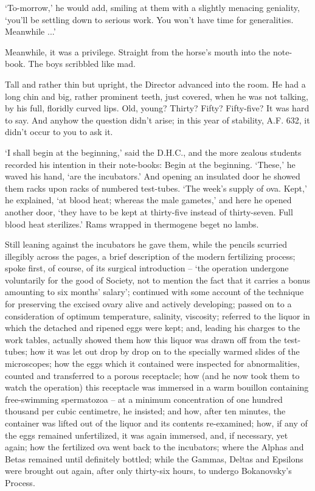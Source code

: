 \documentclass[10pt,a4paper]{article}
\newcommand{\sqm}[1]{‘#1’}
\begin{document}
\sqm{To-morrow,} he would add, smiling at them with a slightly menacing geniality, \sqm{you'll be settling down to serious work. You won't have time for generalities. Meanwhile ...}

Meanwhile, it was a privilege. Straight from the horse's mouth into the note-book. The boys scribbled like mad.

Tall and rather thin but upright, the Director advanced into the room. He had a long chin and big, rather prominent teeth, just covered, when he was not talking, by his full, floridly curved lips. Old, young? Thirty? Fifty? Fifty-five? It was hard to say. And anyhow the question didn't arise; in this year of stability, A.F. 632, it didn't occur to you to ask it.

\sqm{I shall begin at the beginning,} said the D.H.C., and the more zealous students recorded his intention in their note-books: Begin at the beginning. \sqm{These,} he waved his hand, \sqm{are the incubators.} And opening an insulated door he showed them racks upon racks of numbered test-tubes. \sqm{The week's supply of ova. Kept,} he explained, \sqm{at blood heat; whereas the male gametes,} and here he opened another door, \sqm{they have to be kept at thirty-five instead of thirty-seven. Full blood heat sterilizes.} Rams wrapped in thermogene beget no lambs.

Still leaning against the incubators he gave them, while the pencils scurried illegibly across the pages, a brief description of the modern fertilizing process; spoke first, of course, of its surgical introduction – \sqm{the operation undergone voluntarily for the good of Society, not to mention the fact that it carries a bonus amounting to six months' salary}; continued with some account of the technique for preserving the excised ovary alive and actively developing; passed on to a consideration of optimum temperature, salinity, viscosity; referred to the liquor in which the detached and ripened eggs were kept; and, leading his charges to the work tables, actually showed them how this liquor was drawn off from the test-tubes; how it was let out drop by drop on to the specially warmed slides of the microscopes; how the eggs which it contained were inspected for abnormalities, counted and transferred to a porous receptacle; how (and he now took them to watch the operation) this receptacle was immersed in a warm bouillon containing free-swimming spermatozoa – at a minimum concentration of one hundred thousand per cubic centimetre, he insisted; and how, after ten minutes, the container was lifted out of the liquor and its contents re-examined; how, if any of the eggs remained unfertilized, it was again immersed, and, if necessary, yet again; how the fertilized ova went back to the incubators; where the Alphas and Betas remained until definitely bottled; while the Gammas, Deltas and Epsilons were brought out again, after only thirty-six hours, to undergo Bokanovsky's Process.
\end{document}
